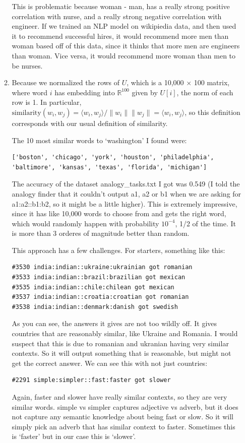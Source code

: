 \documentclass[12pt]{article}
\theoremstyle{definitionstyle}
\def\mbb#1{\mathbb{#1}}
\def \R{\mbb{R}}
\newcommand{\mg}[1]{\| #1 \|}
\renewcommand{\ip}[1]{\langle #1 \rangle}
\begin{document}
\begin{enumerate}[leftmargin=\labelsep]
\begin{enumerate}[label=\textbf{(\alph*)}]
                 This is problematic because woman - man, has a really strong positive correlation with nurse, and a really strong negative correlation with engineer. If we trained an NLP model on wikipiedia data, and then used it to recommend successful hires, it would recommend more men than woman based off of this data, since it thinks that more men are engineers than woman. Vice versa, it would recommend more woman than men to be nurses.

                 \item Because we normalized the rows of $U$, which is a 10,000 $\times$ 100 matrix, where word $i$ has embedding into $\R^{100}$ given by $U[i]$, the norm of each row is 1. In particular, $\text{similarity}(w_i,w_j) = \ip{w_i, w_j} / \mg{w_i}\mg{w_j} = \ip{w_i,w_j}$, so this definition corresponds with our usual definition of similarity.

                 The 10 most similar words to `washington' I found were:
                 \begin{lstlisting}
['boston', 'chicago', 'york', 'houston', 'philadelphia', 'baltimore', 'kansas', 'texas', 'florida', 'michigan']
                 \end{lstlisting}

                 The accuracy of the dataset analogy\_tasks.txt I got was 0.549 (I told the analogy finder that it couldn't output a1, a2 or b1 when we are asking for a1:a2::b1:b2, so it might be a little higher). This is extremely impressive, since it has like 10,000 words to choose from and gets the right word, which would randomly happen with probability $10^{-4}$, 1/2 of the time. It is more than 3 orderes of magnitude better than random.

                 This approach has a few challenges. For starters, something like this:
                 \begin{lstlisting}
#3530 india:indian::ukraine:ukrainian got romanian
#3533 india:indian::brazil:brazilian got mexican
#3535 india:indian::chile:chilean got mexican
#3537 india:indian::croatia:croatian got romanian
#3538 india:indian::denmark:danish got swedish
                 \end{lstlisting}
                 As you can see, the answers it gives are not too wildly off. It gives countries that are reasonably similar, like Ukraine and Romania. I would suspect that this is due to romanian and ukranian having very similar contexts. So it will output something that is reasonable, but might not get the correct answer. We can see this with not just countries:
                 \begin{lstlisting}
#2291 simple:simpler::fast:faster got slower
                 \end{lstlisting}
                 Again, faster and slower have really similar contexts, so they are very similar words. simple vs simpler captures adjective vs adverb, but it does not capture any semantic knowledge about being fast or slow. So it will simply pick an adverb that has similar context to faster. Sometimes this is `faster' but in our case this is `slower'. 


\end{enumerate}
\end{enumerate}
\end{document}
